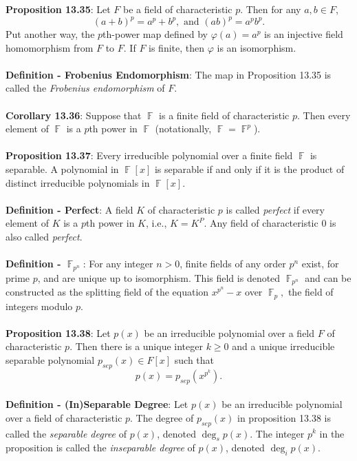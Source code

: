 \documentclass{article}
\DeclareMathOperator{\F}{\mathbb{F}}
\begin{document}
\textbf{Proposition 13.35}: Let $F$ be a field of characteristic $p$. Then for any $a, b \in F$, $$(a + b)^p = a^p + b^p, \text{ and } (ab)^p = a^p b^p.$$ Put another way, the $p$th-power map defined by $\varphi(a) = a^p$ is an injective field homomorphism from $F$ to $F$. If $F$ is finite, then $\varphi$ is an isomorphism. \\ \\
\textbf{Definition - Frobenius Endomorphism}: The map in Proposition 13.35 is called the \textit{Frobenius endomorphism} of $F$. \\ \\
\textbf{Corollary 13.36}: Suppose that $\F$ is a finite field of characteristic $p$. Then every element
of $\F$ is a $p$th power in $\F$ (notationally, $\F = \F^p$). \\ \\
\textbf{Proposition 13.37}: Every irreducible polynomial over a finite field $\F$ is separable. A polynomial in $\F[x]$ is separable if and only if it is the product of distinct irreducible polynomials in $\F[x]$. \\ \\
\textbf{Definition - Perfect}: A field $K$ of characteristic $p$ is called \textit{perfect} if every element of $K$ is a $p$th power in $K$, i.e., $K = K^P$. Any field of characteristic 0 is also called \textit{perfect}. \\ \\
\textbf{Definition - $\F_{p^n}$}: For any integer $n > 0$, finite fields of any order $p^n$ exist, for prime $p$, and are unique up to isomorphism. This field is denoted $\F_{p^n}$ and can be constructed as the splitting field of the equation $x^{p^n} - x$ over $\F_p,$ the field of integers modulo $p.$ \\ \\
\textbf{Proposition 13.38}: Let $p(x)$ be an irreducible polynomial over a field $F$ of characteristic $p$. Then there is a unique integer $k \geq 0$ and a unique irreducible separable polynomial $p_{sep}(x) \in F[x]$ such that $$p(x) = p_{sep} \left( x^{p^k} \right) .$$ \\
\textbf{Definition - (In)Separable Degree}: Let $p(x)$ be an irreducible polynomial over a field of characteristic $p$. The degree of $p_{sep}(x)$ in proposition 13.38 is called the \textit{separable degree} of $p(x)$, denoted $\deg_s p(x)$. The integer $p^k$ in the proposition is called the \textit{inseparable degree} of $p(x)$, denoted $\deg_i p(x)$. \\ \\
\end{document}
